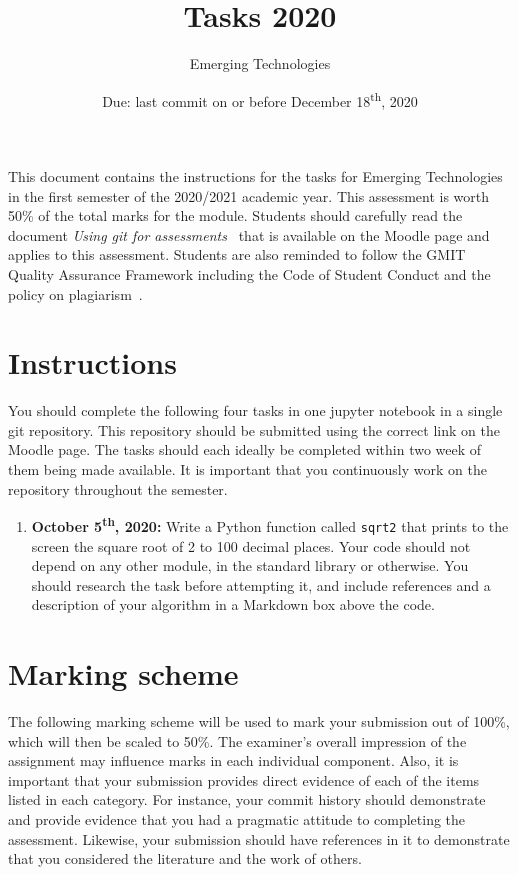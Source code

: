 \documentclass[a4paper, 12pt]{scrartcl}
\title{Tasks 2020}
\author{Emerging Technologies}
\date{Due: last commit on or before December 18\textsuperscript{th}, 2020}
\begin{document}
  
  \maketitle

  This document contains the instructions for the tasks for Emerging Technologies in the first semester of the 2020/2021 academic year.
  This assessment is worth 50\% of the total marks for the module.
  Students should carefully read the document \emph{Using git for assessments}~\cite{usinggit} that is available on the Moodle page and applies to this assessment.
  Students are also reminded to follow the GMIT Quality Assurance Framework including the Code of Student Conduct and the policy on plagiarism~\cite{gmitqaf}.

  \section*{Instructions}
  You should complete the following four tasks in one jupyter notebook in a single git repository.
  This repository should be submitted using the correct link on the Moodle page.
  The tasks should each ideally be completed within two week of them being made available.
  It is important that you continuously work on the repository throughout the semester.
  \begin{enumerate}
    \item
      \textbf{October 5\textsuperscript{th}, 2020:} Write a Python function called \texttt{sqrt2} that prints to the screen the square root of 2 to 100 decimal places.
      Your code should not depend on any other module, in the standard library or otherwise.
      You should research the task before attempting it, and include references and a description of your algorithm in a Markdown box above the code.
  \end{enumerate}


\newpage

\section*{Marking scheme}
  The following marking scheme will be used to mark your submission out of 100\%, which will then be scaled to 50\%.
  The examiner's overall impression of the assignment may influence marks in each individual component.
  Also, it is important that your submission provides direct evidence of each of the items listed in each category.
  For instance, your commit history should demonstrate and provide evidence that you had a pragmatic attitude to completing the assessment.
  Likewise, your submission should have references in it to demonstrate that you considered the literature and the work of others.
\end{document}
